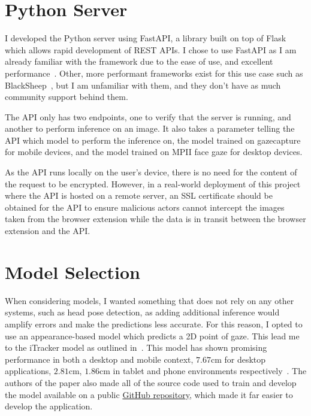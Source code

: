 \documentclass{report}
\begin{document}
\section{Python Server}

I developed the Python server using FastAPI, a library built on top of Flask which allows rapid development of REST APIs. I chose to use FastAPI as I am already familiar with the framework due to the ease of use, and excellent performance~\cite{klenov2015benchmark}. Other, more performant frameworks exist for this use case such as BlackSheep~\cite{prevato2018blacksheep}, but I am unfamiliar with them, and they don't have as much community support behind them.  

The API only has two endpoints, one to verify that the server is running, and another to perform inference on an image. It also takes a parameter telling the API which model to perform the inference on, the model trained on gazecapture for mobile devices, and the model trained on MPII face gaze for desktop devices. 

As the API runs locally on the user's device, there is no need for the content of the request to be encrypted. However, in a real-world deployment of this project where the API is hosted on a remote server, an SSL certificate should be obtained for the API to ensure malicious actors cannot intercept the images taken from the browser extension while the data is in transit between the browser extension and the API. 


\section{Model Selection}

When considering models, I wanted something that does not rely on any other systems, such as head pose detection, as adding additional inference would amplify errors and make the predictions less accurate. For this reason, I opted to use an appearance-based model which predicts a 2D point of gaze. This lead me to the iTracker model as outlined in~\cite{krafka2016eye}. This model has shown promising performance in both a desktop and mobile context, \(7.67\text{cm}\) for desktop applications, \(2.81\text{cm}\), \(1.86\text{cm}\) in tablet and phone environments respectively~\cite{cheng2021survey}. The authors of the paper also made all of the source code used to train and develop the model available on a public \href{https://github.com/yihuacheng/Itracker}{GitHub repository}, which made it far easier to develop the application. 
\end{document}

